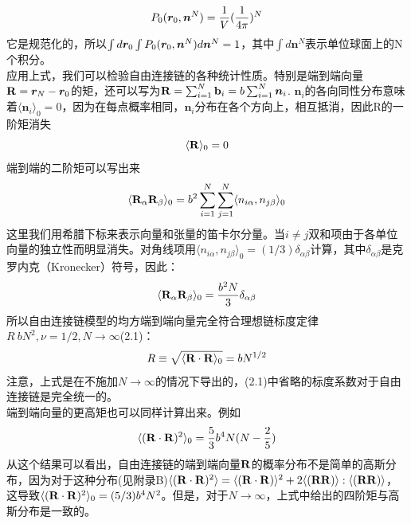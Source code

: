 \begin{equation}
P_0(\bm{r}_0,\bm{n}^{N})=\frac{1}{V} (\frac{1}{4 \pi})^{N}
\label{2.8}
\end{equation}
它是规范化的，所以$\int d\bm{r}_0\int P_0(\bm{r}_0,\bm{n}^{N})d\bm{n}^{N}=1$，其中$\int d\bm{n}^{N}$表示单位球面上的N个积分。\\
应用上式，我们可以检验自由连接链的各种统计性质。特别是端到端向量$\mathbf{R}=\bm{r}_{N}-\bm{r}_0$的矩，还可以写为$\mathbf{R}=\sum _{i=1}^{N} \mathbf{b}_{i}=b \sum _{i=1}^{N} \bm{n}_{i}$.
$\bm{n}_{i}$的各向同性分布意味着$\langle \bm{n}_{i}\rangle _{0}=0$，因为在每点概率相同，$\bm{n}_{i}$分布在各个方向上，相互抵消，因此R的一阶矩消失\\
\begin{equation}
\langle \mathbf{R} \rangle_{0}=0
\label{2.9}
\end{equation}
端到端的二阶矩可以写出来\\
\begin{equation}
\langle \mathbf{R}_{\alpha} \mathbf{R}_{\beta}\rangle_{0}=b^2 \sum _{i=1}^{N} \sum _{j=1}^{N} \langle n_{i \alpha},n_{j \beta} \rangle_{0}
\label{2.10}
\end{equation}
这里我们用希腊下标来表示向量和张量的笛卡尔分量。当$i\neq j$双和项由于各单位向量的独立性而明显消失。对角线项用$\langle n_{i \alpha},n_{j \beta} \rangle_{0}=(1/3)\delta_{\alpha  \beta }$计算，其中$\delta_{\alpha \beta }$是克罗内克（Kronecker）符号，因此：\\
\begin{equation}
\langle \mathbf{R}_{\alpha} \mathbf{R}_{\beta}\rangle_{0}=\frac{b^{2}N}{3}\delta_{\alpha \beta }
\label{2.11}
\end{equation}
所以自由连接链模型的均方端到端向量完全符合理想链标度定律$R~bN^2,\nu=1/2,N \rightarrow \infty $(2.1)：\\
\begin{equation}
R\equiv \sqrt{\langle \mathbf{R} \cdot \mathbf{R}\rangle _{0}}=bN^{1/2}
\label{2.12}
\end{equation}
注意，上式是在不施加$N\rightarrow \infty$的情况下导出的，(2.1)中省略的标度系数对于自由连接链是完全统一的。\\

端到端向量的更高矩也可以同样计算出来。例如\\
\begin{equation}
\langle (\mathbf{R} \cdot \mathbf{R})^2 \rangle_{0}=\frac{5}{3}b^4N(N-\frac{2}{5})
\label{2.13}
\end{equation}
从这个结果可以看出，自由连接链的端到端向量$\mathbf{R}$的概率分布不是简单的高斯分布，因为对于这种分布(见附录B)$\langle (\mathbf{R} \cdot \mathbf{R})^2 \rangle=\langle (\mathbf{R} \cdot \mathbf{R}) \rangle^2+2\langle (\mathbf{R} \mathbf{R})\rangle:\langle (\mathbf{R} \mathbf{R})\rangle$，这导致$\langle (\mathbf{R} \cdot \mathbf{R})^2 \rangle_{0}=(5/3)b^4N^2$。但是，对于$N\rightarrow \infty$，上式中给出的四阶矩与高斯分布是一致的。\\


